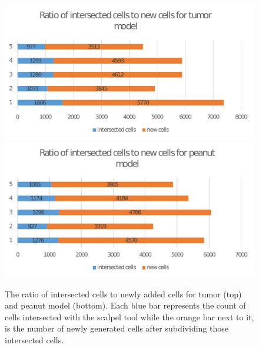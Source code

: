 \begin{figure}[H]
  \centering
  \includegraphics[width=1.0\linewidth]{figures/cutting/cutting_intersected_vs_new_tumor.pdf}
  \includegraphics[width=1.0\linewidth]{figures/cutting/cutting_intersected_vs_new_peanut.pdf}
  \caption{\label{fig:cutting_intersected_vs_new}
  {The ratio of intersected cells to newly added cells for tumor (top) and peanut model (bottom). Each blue bar represents the count of cells 
  intersected with the scalpel tool while the orange bar next to it, is the number of newly generated cells after subdividing those intersected cells.}
}
\end{figure}
